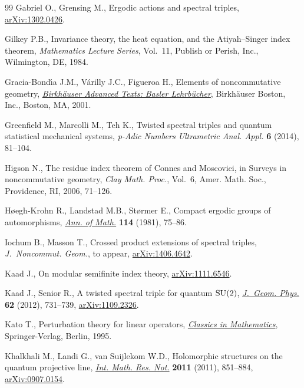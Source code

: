 \documentclass[pdftex]{sigma}
\numberwithin{equation}{section}
\begin{document}
\begin{thebibliography}{99}
Gabriel O., Grensing M., Ergodic actions and spectral triples,
 \href{http://arxiv.org/abs/1302.0426}{arXiv:1302.0426}.

Gilkey P.B., Invariance theory, the heat equation, and the {A}tiyah--{S}inger
 index theorem, \textit{Mathematics Lecture Series}, Vol.~11, Publish or
 Perish, Inc., Wilmington, DE, 1984.

Gracia-Bond{\'{\i}}a J.M., V{\'a}rilly J.C., Figueroa H., Elements of
 noncommutative geometry, \href{http://dx.doi.org/10.1007/978-1-4612-0005-5}{\textit{Birkh\"auser Advanced Texts: Basler Lehrb\"ucher}},
 Birkh\"auser Boston, Inc., Boston, MA, 2001.

Greenf\/ield M., Marcolli M., Teh K., Twisted spectral triples and quantum
 statistical mechanical systems, \textit{p-Adic Numbers Ultrametric Anal.
 Appl.} \textbf{6} (2014), 81--104.

Higson N., The residue index theorem of {C}onnes and {M}oscovici, in Surveys in
 noncommutative geometry, \textit{Clay Math. Proc.}, Vol.~6, Amer. Math. Soc.,
 Providence, RI, 2006, 71--126.

H{\o}egh-Krohn R., Landstad M.B., St{\o}rmer E., Compact ergodic groups of
 automorphisms, \href{http://dx.doi.org/10.2307/1971377}{\textit{Ann. of Math.}} \textbf{114} (1981), 75--86.

Iochum B., Masson T., Crossed product extensions of spectral triples,
 \textit{J.~Noncommut. Geom.}, {t}o appear, \href{http://arxiv.org/abs/1406.4642}{arXiv:1406.4642}.

Kaad J., On modular semif\/inite index theory, \href{http://arxiv.org/abs/1111.6546}{arXiv:1111.6546}.

Kaad J., Senior R., A twisted spectral triple for quantum {${\rm SU}(2)$},
 \href{http://dx.doi.org/10.1016/j.geomphys.2011.12.019}{\textit{J.~Geom. Phys.}} \textbf{62} (2012), 731--739, \href{http://arxiv.org/abs/1109.2326}{arXiv:1109.2326}.

Kato T., Perturbation theory for linear operators, \href{http://dx.doi.org/10.1007/978-3-642-66282-9}{\textit{Classics in Mathematics}},
 Springer-Verlag, Berlin, 1995.

Khalkhali M., Landi G., van Suijlekom W.D., Holomorphic structures on the
 quantum projective line, \href{http://dx.doi.org/10.1093/imrn/rnq097}{\textit{Int. Math. Res. Not.}} \textbf{2011} (2011),
 851--884, \href{http://arxiv.org/abs/0907.0154}{arXiv:0907.0154}.


\end{thebibliography}
\end{document}
